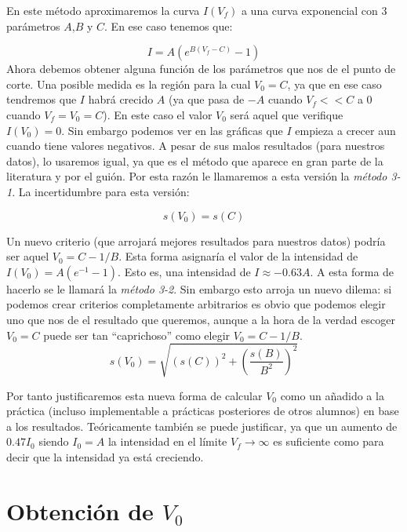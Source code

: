 \documentclass[12pt,a4paper]{article}
\numberwithin{equation}{section}
\numberwithin{table}{section}
\numberwithin{figure}{section}
\newcommand{\parentesis}[1]{\left( #1  \right)}
\begin{document}
En este método aproximaremos la curva $I(V_f)$ a una curva exponencial con 3 parámetros $A$,$B$ y $C$. En ese caso tenemos que:

\begin{equation}
I = A \parentesis{e^{B(V_f-C)}-1}
\end{equation}
Ahora debemos obtener alguna función de los parámetros que nos de el punto de corte. Una posible medida es la región para la cual $V_0 = C$, ya que en ese caso tendremos que $I$ habrá crecido $A$ (ya que pasa de $-A$ cuando $V_f<<C$ a $0$ cuando $V_f=V_0=C$). En este caso el valor $V_0$ será aquel que verifique $I(V_0) = 0$. Sin embargo podemos ver en las gráficas que $I$ empieza a crecer aun cuando tiene valores negativos. A pesar de sus malos resultados (para nuestros datos), lo usaremos igual, ya que es el método que aparece en gran parte de la literatura y por el guión. Por esta razón le llamaremos a esta versión la \textit{método 3-1}. La incertidumbre para esta versión:

\begin{equation}
s(V_0) = s(C)
\end{equation}

Un nuevo criterio (que arrojará mejores resultados para nuestros datos) podría ser aquel $V_0 = C-1/B$. Esta forma asignaría el valor de la intensidad de $I(V_0)=A(e^{-1}-1)$. Esto es, una intensidad de $I\approx-0.63A$. A esta forma de hacerlo se le llamará la \textit{método 3-2}. Sin embargo esto arroja un nuevo dilema: si podemos crear criterios completamente arbitrarios es obvio que podemos elegir uno que nos de el resultado que queremos, aunque a la hora de la verdad escoger $V_0=C$ puede ser tan ``caprichoso'' como elegir $V_0=C-1/B$. \\


\begin{equation}
s(V_0) = \sqrt{\parentesis{s(C)}^2+\parentesis{\frac{s(B)}{B^2}}^2}
\end{equation}

Por tanto justificaremos esta nueva forma de calcular $V_0$ como un añadido a la práctica (incluso implementable a prácticas posteriores de otros alumnos) en base a los resultados. Teóricamente también se puede justificar, ya que un aumento de $0.47I_0$ siendo $I_0=A$ la intensidad   en el límite $V_f \rightarrow \infty$ es suficiente como para decir que la intensidad ya está creciendo.  \\

\section{Obtención de $V_0$}
\end{document}
